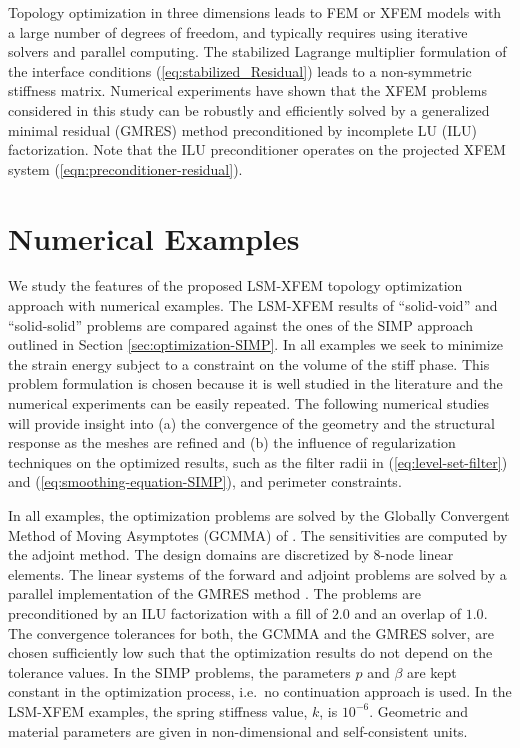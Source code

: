 Topology optimization in three dimensions leads to FEM or XFEM models with a large number of degrees of freedom, and typically requires using iterative solvers and parallel computing. The stabilized Lagrange multiplier formulation of the interface conditions (\ref{eq:stabilized_Residual}) leads to a non-symmetric stiffness matrix. Numerical experiments have shown that the XFEM problems considered in this study can be robustly and efficiently solved by a generalized minimal residual (GMRES) method preconditioned by incomplete LU (ILU) factorization. Note that the ILU preconditioner operates on the projected XFEM system (\ref{eqn:preconditioner-residual}).


\section{Numerical Examples}
\label{sec:numerical-examples}

We study the features of the proposed LSM-XFEM topology optimization approach with numerical examples. The LSM-XFEM results of ``solid-void'' and ``solid-solid'' problems are compared against the ones of the SIMP approach outlined in Section \ref{sec:optimization-SIMP}. In all examples we seek to minimize the strain energy subject to a constraint on the volume of the stiff phase. This problem formulation is chosen because it is well studied in the literature and the numerical experiments can be easily repeated. The following numerical studies will provide insight into (a) the convergence of the geometry and the structural response as the meshes are refined and (b) the influence of regularization techniques on the optimized results, such as the filter radii in (\ref{eq:level-set-filter}) and (\ref{eq:smoothing-equation-SIMP}), and perimeter constraints.

In all examples, the optimization problems are solved by the Globally Convergent Method of Moving Asymptotes (GCMMA) of \citet{Svanberg:02}. The sensitivities are computed by the adjoint method. The design domains are discretized by 8-node linear elements. The linear systems of the forward and adjoint problems are solved by a parallel implementation of the GMRES method \citep{Trilinos:03}. The problems are preconditioned by an ILU factorization with a fill of $2.0$ and an overlap of $1.0$. The convergence tolerances for both, the GCMMA and the GMRES solver, are chosen sufficiently low such that the optimization results do not depend on the tolerance values. In the SIMP problems, the parameters $p$ and $\beta$ are kept constant in the optimization process, i.e.~no continuation approach is used. In the LSM-XFEM examples, the spring stiffness value, $k$, is $10^{-6}$. Geometric and material parameters are given in non-dimensional and self-consistent units.

